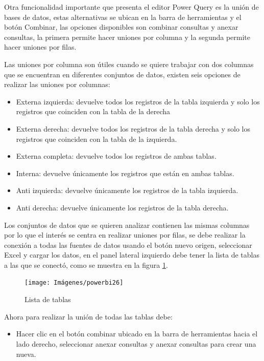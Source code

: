 \documentclass[
]{book}
\providecommand{\tightlist}{%
  \setlength{\itemsep}{0pt}\setlength{\parskip}{0pt}}
\begin{document}
Otra funcionalidad importante que presenta el editor Power Query es la unión de bases de datos, estas alternativas se ubican en la barra de herramientas y el botón Combinar, las opciones disponibles son combinar consultas y anexar consultas, la primera permite hacer uniones por columna y la segunda permite hacer uniones por filas.

Las uniones por columna son útiles cuando se quiere trabajar con dos columnas que se encuentran en diferentes conjuntos de datos, existen seis opciones de realizar las uniones por columnas:

\begin{itemize}
\tightlist
\item
  Externa izquierda: devuelve todos los registros de la tabla izquierda y solo los registros que coinciden con la tabla de la derecha
\item
  Externa derecha: devuelve todos los registros de la tabla derecha y solo los registros que coinciden con la tabla de la izquierda.
\item
  Externa completa: devuelve todos los registros de ambas tablas.
\item
  Interna: devuelve únicamente los registros que están en ambas tablas.
\item
  Anti izquierda: devuelve únicamente los registros de la tabla izquierda.
\item
  Anti derecha: devuelve únicamente los registros de la tabla derecha.
\end{itemize}

Los conjuntos de datos que se quieren analizar contienen las mismas columnas por lo que el interés se centra en realizar uniones por filas, se debe realizar la conexión a todas las fuentes de datos usando el botón nuevo origen, seleccionar Excel y cargar los datos, en el panel lateral izquierdo debe tener la lista de tablas a las que se conectó, como se muestra en la figura \ref{fig:listamicrodatos-fig}.

\begin{figure}

{\centering \texttt{[image: Imágenes/powerbi26]} 

}

\caption{Lista de tablas}\label{fig:listamicrodatos-fig}
\end{figure}

Ahora para realizar la unión de todas las tablas debe:

\begin{itemize}
\tightlist
\item
  Hacer clic en el botón combinar ubicado en la barra de herramientas hacia el lado derecho, seleccionar anexar consultas y anexar consultas para crear una nueva.
\end{itemize}
\end{document}
